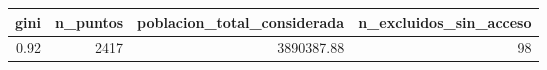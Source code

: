 \begin{tabular}{rrrr}
\toprule
gini & n_puntos & poblacion_total_considerada & n_excluidos_sin_acceso \\
\midrule
0.92 & 2417 & 3890387.88 & 98 \\
\bottomrule
\end{tabular}
